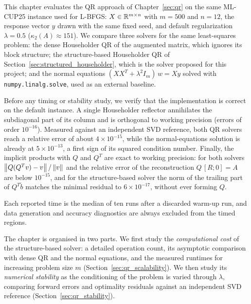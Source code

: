 \label{sec:qr_exp}
\noindent This chapter evaluates the QR approach of Chapter~\ref{sec:qr} on the
same ML-CUP25 instance used for L-BFGS: $X\in\mathbb{R}^{m\times n}$ with $m=500$ and
$n=12$, the response vector $y$ drawn with the same fixed seed, and default
regularization $\lambda=0.5$ ($\kappa_2(A)\approx151$). We compare three
solvers for the same least-squares problem: the dense Householder QR of the
augmented matrix, which ignores its block structure; the structure-based
Householder QR of Section~\ref{sec:structured_householder}, which is the
solver proposed for this project; and the normal equations
$(XX^T+\lambda^2I_m)\,w=Xy$ solved with \texttt{numpy.linalg.solve}, used as
an external baseline.

\noindent Before any timing or stability study, we verify that the
implementation is correct on the default instance. A single Householder
reflector annihilates the subdiagonal part of its column and is orthogonal to
working precision (errors of order $10^{-16}$). Measured against an
independent SVD reference, both QR solvers reach a relative error of about
$4 \times 10^{-15}$, while the normal-equations solution is already at
$5 \times 10^{-13}$, a first sign of its squared condition number. Finally,
the implicit products with $Q$ and $Q^T$ are exact to working precision: for
both solvers $\left\|Q(Q^Tv) - v\right\|/\left\|v\right\|$ and the relative error of the
reconstruction $Q\,[R;0] = A$ are below $10^{-15}$, and for the
structure-based solver the norm of the trailing part of $Q^T\tilde b$ matches
the minimal residual to $6 \times 10^{-17}$, without ever forming $Q$.

\noindent Each reported time is the median of ten runs after a discarded
warm-up run, and data generation and accuracy diagnostics are always excluded
from the timed regions.

\noindent The chapter is organised in two parts. We first study the
\emph{computational cost} of the structure-based solver: a detailed operation
count, its asymptotic comparison with dense QR and the normal equations, and
the measured runtimes for increasing problem size $m$
(Section~\ref{sec:qr_scalability}). We then study its \emph{numerical
stability} as the conditioning of the problem is varied through $\lambda$,
comparing forward errors and optimality residuals against an independent SVD
reference (Section~\ref{sec:qr_stability}).


